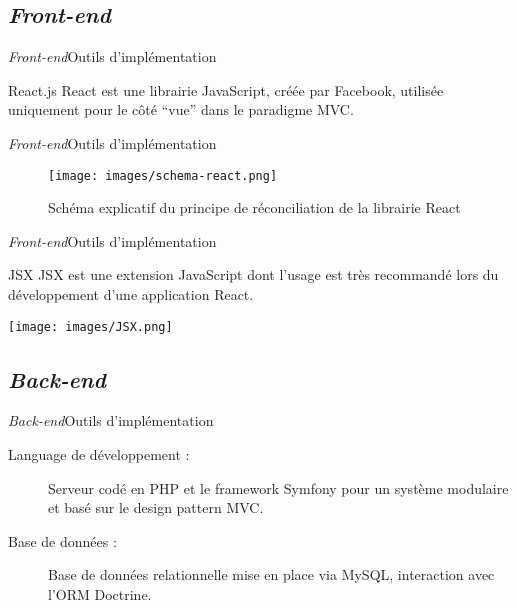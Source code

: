 \documentclass[usenames,dvipsnames]{beamer}
\begin{document}
\subsection{\protect\textit{Front-end}}
\begin{frame}{\textit{Front-end}}{Outils d'implémentation}
\begin{block}{React.js}
React est une librairie JavaScript, créée par Facebook, utilisée uniquement pour le côté “vue” dans le paradigme MVC.
\end{block}
\end{frame}
\begin{frame}{\textit{Front-end}}{Outils d'implémentation}
\begin{figure}
  \texttt{[image: images/schema-react.png]}
  \caption{Schéma explicatif du principe de réconciliation de la librairie React}

\end{figure}
\end{frame}
\begin{frame}{\textit{Front-end}}{Outils d'implémentation}
  \begin{block}{JSX}
 JSX est une extension JavaScript dont l'usage est très recommandé lors du développement d'une application React.  
  \end{block}
  \texttt{[image: images/JSX.png]}

\end{frame}

\subsection{\protect\textit{Back-end}}
\begin{frame}{\textit{Back-end}}{Outils d'implémentation}
  \begin{description}
    \item[Language de développement :] Serveur codé en PHP et le framework Symfony pour un système modulaire et basé sur le design pattern MVC.
    \item[Base de données :] Base de données relationnelle mise en place via MySQL, interaction avec l'ORM Doctrine.
  \end{description}
\end{frame}
\end{document}
